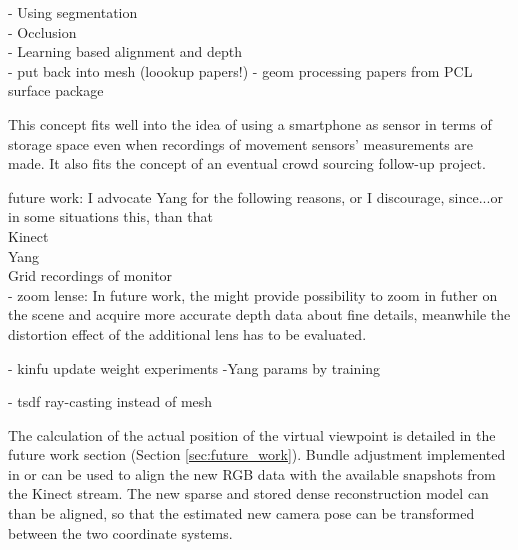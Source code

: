 \documentclass{ucl_thesis}
\newcommand{\secref}[1]{(Section \ref{#1})}
\begin{document}
- Using segmentation \citep{Silberman:ECCV12} \\
- Occlusion \citep{Hoiem:2011} \\
- Learning based alignment and depth \citep{Herrera:LearnedJointMRF} \\
- put back into mesh (loookup papers!)
- geom processing papers from PCL surface package

This concept fits well into the idea of using a smartphone as sensor in terms of storage space even when recordings of movement sensors' measurements are made. It also fits the concept of an eventual crowd sourcing follow-up project. 

future work: I advocate Yang for the following reasons, or I discourage, since...or in some situations this, than that \\
Kinect \\
Yang \\
Grid recordings of monitor\\

    - zoom lense: \citep{Kinect_nyko_zoom}
In future work, the \citep{Kinect_nyko_zoom} might provide possibility to zoom in futher on the scene and acquire more accurate depth data about fine details, meanwhile the distortion effect of the additional lens has to be evaluated.

- kinfu update weight experiments
-Yang params by training

- tsdf ray-casting instead of mesh

\par The calculation of the actual position of the virtual viewpoint is detailed in the future work section \secref{sec:future_work}. Bundle adjustment implemented in \citep{SnavelySS06} or \citep{vsfm} can be used to align the new RGB data with the available snapshots from the Kinect stream. The new sparse and stored dense reconstruction model can than be aligned, so that the estimated new camera pose can be transformed between the two coordinate systems.
\end{document}
